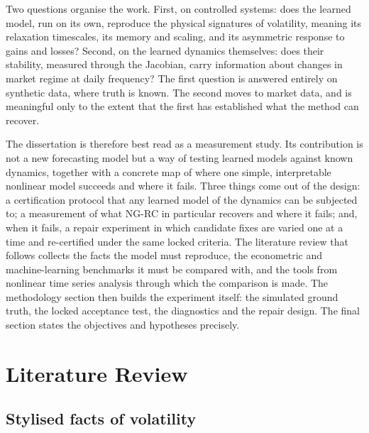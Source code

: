 \documentclass[12pt,a4paper]{article}
\begin{document}
Two questions organise the work. First, on controlled systems: does the
learned model, run on its own, reproduce the physical signatures of
volatility, meaning its relaxation timescales, its memory and scaling, and
its asymmetric response to gains and losses? Second, on the learned
dynamics themselves: does their stability, measured through the Jacobian,
carry information about changes in market regime at daily frequency?
The first
question is answered entirely on synthetic data, where truth is known.
The second moves to market data, and is meaningful only to the
extent that the first has established what the method can recover.

The dissertation is therefore best read as a measurement study. Its
contribution is not a new forecasting model but a way of testing learned
models against known dynamics, together with a concrete map of where one
simple, interpretable nonlinear model succeeds and where it fails.
Three things come out of the design: a certification protocol that any
learned model of the dynamics can be subjected to; a measurement of what
NG-RC in particular recovers and where it fails; and, when it fails, a
repair experiment in which candidate fixes are varied one at a time and
re-certified under the same locked criteria. The
literature review that follows collects the facts the model must
reproduce, the econometric and machine-learning benchmarks it must be
compared with, and the tools from nonlinear time series analysis through
which the comparison is made. The methodology section then builds the
experiment itself: the simulated ground truth, the locked acceptance
test, the diagnostics and the repair design. The final section states
the objectives and hypotheses precisely.

\newpage

\section{Literature Review}

\subsection{Stylised facts of volatility}
\end{document}
